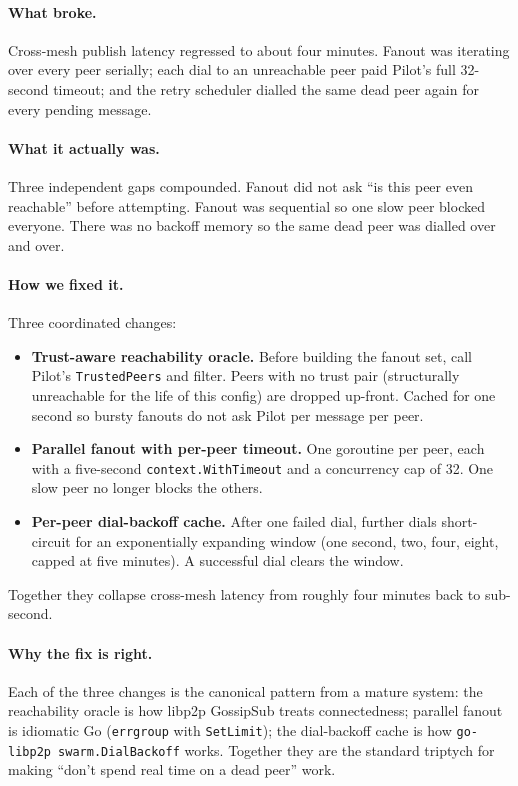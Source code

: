 \documentclass[11pt,a4paper]{article}
\begin{document}
\paragraph{What broke.} Cross-mesh publish latency regressed to
about four minutes. Fanout was iterating over every peer
serially; each dial to an unreachable peer paid Pilot's full
32-second timeout; and the retry scheduler dialled the same
dead peer again for every pending message.

\paragraph{What it actually was.} Three independent gaps
compounded. Fanout did not ask ``is this peer even reachable''
before attempting. Fanout was sequential so one slow peer
blocked everyone. There was no backoff memory so the same dead
peer was dialled over and over.

\paragraph{How we fixed it.} Three coordinated changes:

\begin{itemize}[leftmargin=1.2em]
    \item \textbf{Trust-aware reachability oracle.} Before
    building the fanout set, call Pilot's
    \texttt{TrustedPeers} and filter. Peers with no trust pair
    (structurally unreachable for the life of this config) are
    dropped up-front. Cached for one second so bursty fanouts
    do not ask Pilot per message per peer.
    \item \textbf{Parallel fanout with per-peer timeout.} One
    goroutine per peer, each with a five-second
    \texttt{context.WithTimeout} and a concurrency cap of 32.
    One slow peer no longer blocks the others.
    \item \textbf{Per-peer dial-backoff cache.} After one
    failed dial, further dials short-circuit for an
    exponentially expanding window (one second, two, four,
    eight, capped at five minutes). A successful dial clears the
    window.
\end{itemize}

Together they collapse cross-mesh latency from roughly four
minutes back to sub-second.

\paragraph{Why the fix is right.} Each of the three changes is
the canonical pattern from a mature system: the reachability
oracle is how libp2p GossipSub treats connectedness; parallel
fanout is idiomatic Go (\texttt{errgroup} with
\texttt{SetLimit}); the dial-backoff cache is how
\texttt{go-libp2p swarm.DialBackoff} works. Together they are
the standard triptych for making ``don't spend real time on a
dead peer'' work.
\end{document}

